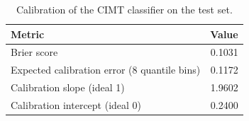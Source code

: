 \begin{table}
\caption{Calibration of the CIMT classifier on the test set.}
\label{tab:calibration_metrics}
\begin{tabular}{lr}
\toprule
Metric & Value \\
\midrule
Brier score & 0.1031 \\
Expected calibration error (8 quantile bins) & 0.1172 \\
Calibration slope (ideal 1) & 1.9602 \\
Calibration intercept (ideal 0) & 0.2400 \\
\bottomrule
\end{tabular}
\end{table}
